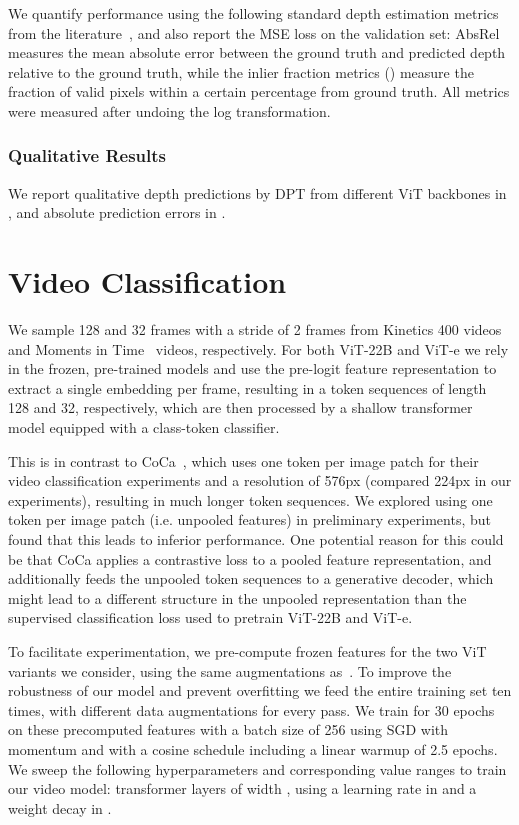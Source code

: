 \documentclass{article}
\begin{document}
We quantify performance using the following standard depth estimation metrics from the literature~\citep{hermann2020self, eigen2014depth}, and also report the MSE loss on the validation set:
AbsRel measures the mean absolute error between the ground truth and predicted depth relative to the ground truth, while the inlier fraction metrics () measure the fraction of valid pixels within a certain 
percentage
from ground truth.
All metrics were measured after undoing the log transformation.

\subsubsection{Qualitative Results}

We report qualitative depth predictions by DPT from different ViT backbones in , and absolute prediction errors in . \section{Video Classification}
\label{sec:app_video_classification}

We sample 128 and 32 frames with a stride of 2 frames from Kinetics 400 videos~\citep{kay2017kinetics} and Moments in Time~\citep{monfort2019moments} videos, respectively. For both ViT-22B and ViT-e we rely in the frozen, pre-trained models and use the pre-logit feature representation to extract a single embedding per frame, resulting in a token sequences of length 128 and 32, respectively, which are then processed by a shallow transformer model equipped with a class-token classifier.

This is in contrast to CoCa~\citep{yu2022coca}, which uses one token per image patch for their video classification experiments and a resolution of 576px (compared 224px in our experiments), resulting in much longer token sequences. We explored using one token per image patch (i.e. unpooled features) in preliminary experiments, but found that this leads to inferior performance. One potential reason for this could be that CoCa applies a contrastive loss to a pooled feature representation, and additionally feeds the unpooled token sequences to a generative decoder, which might lead to a different structure in the unpooled representation than the supervised classification loss used to pretrain ViT-22B and ViT-e.

To facilitate experimentation, we pre-compute frozen features for the two ViT variants we consider, using the same augmentations as~\citep{arnab2021vivit}. To improve the robustness of our model and prevent overfitting we feed the entire training set ten times, with different data augmentations for every pass. We train for 30 epochs on these precomputed features with a batch size of 256 using SGD with momentum and with a cosine schedule including a linear warmup of 2.5 epochs. We sweep the following hyperparameters and corresponding value ranges to train our video model:  transformer layers of width , using a learning rate in  and a weight decay in .
\end{document}
